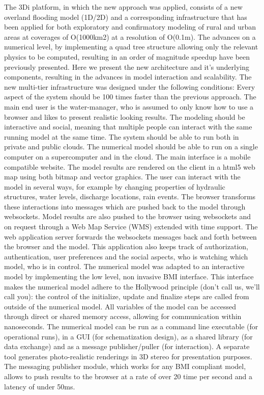 \documentclass[a4paper]{article}
\begin{document}
The 3Di platform, in which the new approach was applied, consists of a new overland flooding model (1D/2D) and a corresponding infrastructure that has been applied for both exploratory and confirmatory modeling of rural and urban areas at coverages of O(1000km2) at a resolution of O(0.1m).
The advances on a numerical level, by implementing a quad tree structure allowing only the relevant physics to be computed, resulting in an order of magnitude speedup have been previously presented. Here we present the new architecture and it's underlying components, resulting in the advances in model interaction and scalability.
The new multi-tier infrastructure was designed under the following conditions:
Every aspect of the system should be 100 times faster than the previous approach.
The main end user is the water-manager, who is assumed to only know how to use a browser and likes to present realistic looking results.
The modeling should be interactive and social, meaning that multiple people can interact with the same running model at the same time.
The system should be able to run both in private and public clouds. The numerical model should be able to run on a single computer on a supercomputer and in the cloud.
The main interface is a mobile compatible website. The model results are rendered on the client in a html5 web map using both bitmap and vector graphics. The user can interact with the model in several ways, for example by changing properties of hydraulic structures, water levels, discharge locations, rain events. The browser transforms these interactions into messages which are pushed back to the model through websockets. Model results are also pushed to the browser using websockets and on request through a Web Map Service (WMS) extended with time support.
The web application server forwards the websockets messages back and forth between the browser and the model. This application also keeps track of authorization, authentication, user preferences and the social aspects, who is watching which model, who is in control.
The numerical model was adapted to an interactive model by implementing the low level, non invasive BMI interface. This interface makes the numerical model adhere to the Hollywood principle (don't call us, we'll call you): the control of the initialize, update and finalize steps are called from outside of the numerical model. All variables of the model can be accessed through direct or shared memory access, allowing for communication within nanoseconds. The numerical model can be run as a command line executable (for operational runs), in a GUI (for schematization design), as a shared library (for data exchange) and as a message publisher/puller (for interaction). A separate tool generates photo-realistic renderings in 3D stereo for presentation purposes. The messaging publisher module, which works for any BMI compliant model, allows to push results to the browser at a rate of over 20 time per second and a latency of under 50ms.
\end{document}
